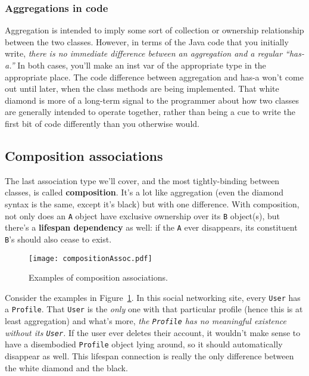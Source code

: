 \subsubsection{Aggregations in code}

Aggregation is intended to imply some sort of collection or ownership
relationship between the two classes. However, in terms of the Java code that
you initially write, \textit{there is no immediate difference between an
aggregation and a regular ``has-a.''} In both cases, you'll make an inst var of
the appropriate type in the appropriate place. The code difference between
aggregation and has-a won't come out until later, when the class methods are
being implemented. That white diamond is more of a long-term signal to the
programmer about how two classes are generally intended to operate together,
rather than being a cue to write the first bit of code differently than you
otherwise would.

\subsection{Composition associations}

The last association type we'll cover, and the most tightly-binding between
classes, is called \textbf{composition}. It's a lot like aggregation (even the
diamond syntax is the same, except it's black) but with one difference. With
composition, not only does an \texttt{A} object have exclusive ownership over
its \texttt{B} object(s), but there's a \textbf{lifespan dependency} as well:
if the \texttt{A} ever disappears, its constituent \texttt{B}'s should also
cease to exist.

\begin{figure}[ht]
\centering
\texttt{[image: compositionAssoc.pdf]}   %
\caption{Examples of composition associations.}
\label{fig:compositionAssoc}
\end{figure}


Consider the examples in Figure~\ref{fig:compositionAssoc}. In this social
networking site, every \texttt{User} has a \texttt{Profile}. That
\texttt{User} is the \textit{only} one with that particular profile (hence
this is at least aggregation) and what's more, \textit{the \texttt{Profile}
has no meaningful existence without its \texttt{User}.} If the user ever
deletes their account, it wouldn't make sense to have a disembodied
\texttt{Profile} object lying around, so it should automatically disappear as
well. This lifespan connection is really the only difference between the white
diamond and the black.

